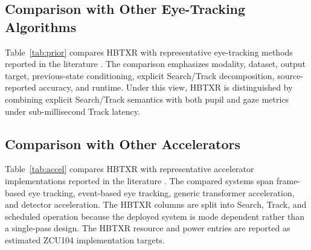 \documentclass[journal]{IEEEtran}
\begin{document}
\subsection{Comparison with Other Eye-Tracking Algorithms}
Table~\ref{tab:prior} compares HBTXR with representative eye-tracking methods reported in the literature \cite{ref5,ref6,ref7,ref8,ref9,ref10}. The comparison emphasizes modality, dataset, output target, previous-state conditioning, explicit Search/Track decomposition, source-reported accuracy, and runtime. Under this view, HBTXR is distinguished by combining explicit Search/Track semantics with both pupil and gaze metrics under sub-millisecond Track latency.

\begin{table}[t]
\caption{Source-Aligned Comparison with Representative Eye-Tracking Algorithms}
\label{tab:prior}
\centering
\scriptsize
{\setlength{\tabcolsep}{3pt}
}
\end{table}

\subsection{Comparison with Other Accelerators}
Table~\ref{tab:accel} compares HBTXR with representative accelerator implementations reported in the literature \cite{ref8,ref9,ref10,ref11,ref12}. The compared systems span frame-based eye tracking, event-based eye tracking, generic transformer acceleration, and detector acceleration. The HBTXR columns are split into Search, Track, and scheduled operation because the deployed system is mode dependent rather than a single-pass design. The HBTXR resource and power entries are reported as estimated ZCU104 implementation targets.
\end{document}
